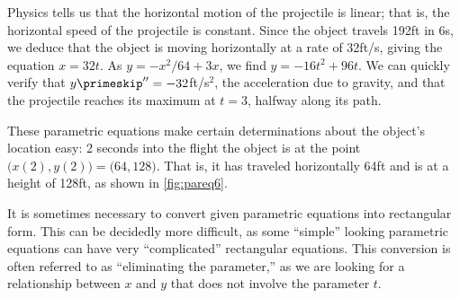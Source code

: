 {Physics tells us that the horizontal motion of the projectile is linear; that is, the horizontal speed of the projectile is constant. Since the object travels 192ft in 6s, we deduce that the object is moving horizontally at a rate of 32ft/s, giving the equation $x=32t$. As $y=-x^2/64+3x$, we find $y= -16t^2+96t$. We can quickly verify that $y\primeskip''=-32$ft/s$^2$, the acceleration due to gravity, and that the projectile reaches its maximum at $t=3$, halfway along its path.


These parametric equations make certain determinations about the object's location easy: 2 seconds into the flight the object is at the point $\big(x(2),y(2)\big) = \big(64,128\big)$. That is, it has traveled horizontally 64ft and is at a height of 128ft, as shown in \autoref{fig:pareq6}.}

It is  sometimes necessary to convert given parametric equations into rectangular form. This can be decidedly more difficult, as some ``simple'' looking parametric equations can have very ``complicated'' rectangular equations. This conversion is often referred to as ``eliminating the parameter,'' as we are looking for a relationship between $x$ and $y$ that does not involve the parameter $t$.

